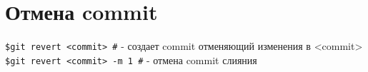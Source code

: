 \section{Отмена commit}
\texttt{\$git revert <commit> \#} - создает commit отменяющий изменения в <commit> \\
\texttt{\$git revert <commit> -m 1 \indent \#}  - отмена commit слияния \\